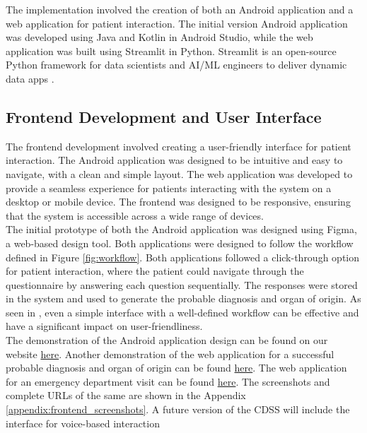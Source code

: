\noindent The implementation involved the creation of both an Android application and a web application for patient interaction. The initial version Android application was developed using Java and Kotlin in Android Studio, while the web application was built using Streamlit in Python. Streamlit is an open-source Python framework for data scientists and AI/ML engineers to deliver dynamic data apps \cite{streamlit}. 

\subsection{Frontend Development and User Interface}
The frontend development involved creating a user-friendly interface for patient interaction. The Android application was designed to be intuitive and easy to navigate, with a clean and simple layout. The web application was developed to provide a seamless experience for patients interacting with the system on a desktop or mobile device. The frontend was designed to be responsive, ensuring that the system is accessible across a wide range of devices.\\[\baselineskip]

\noindent The initial prototype of both the Android application was designed using Figma, a web-based design tool. Both applications were designed to follow the workflow defined in Figure \ref{fig:workflow}. Both applications followed a click-through option for patient interaction, where the patient could navigate through the questionnaire by answering each question sequentially. The responses were stored in the system and used to generate the probable diagnosis and organ of origin. As seen in \cite{eich1999internet}, even a simple interface with a well-defined workflow can be effective and have a significant impact on user-friendliness.\\[\baselineskip]

\noindent The demonstration of the Android application design can be found on our website \href{https://kutumlab.github.io/abdominal-pain-cdss/#mobile-application}{here}. Another demonstration of the web application for a successful probable diagnosis and organ of origin can be found \href{https://kutumlab.github.io/abdominal-pain-cdss/#web-application-diagnosis}{here}. The web application for an emergency department visit can be found \href{https://kutumlab.github.io/abdominal-pain-cdss/#web-application-emergency-visit}{here}. The screenshots and complete URLs of the same are shown in the Appendix \ref{appendix:frontend_screenshots}. A future version of the CDSS will include the interface for voice-based interaction

